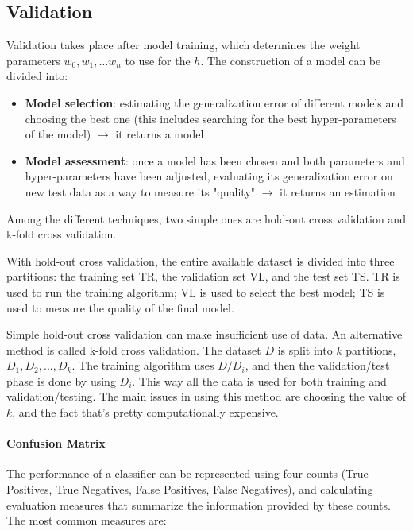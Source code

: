 \subsection{Validation}

Validation takes place after model training, which determines the weight parameters $w_0, w_1, \dots w_n$ to use for the $h$. The construction of a model can be divided into:

\begin{itemize}
    \item \textbf{Model selection}: estimating the generalization error of different models and choosing the best one (this includes searching for the best hyper-parameters of the model) $\xrightarrow{}$ it returns a model

    \item \textbf{Model assessment}: once a model has been chosen and both parameters and hyper-parameters have been adjusted, evaluating its generalization error on new test data as a way to measure its "quality" $\xrightarrow{}$ it returns an estimation
\end{itemize}

Among the different techniques, two simple ones are hold-out cross validation and k-fold cross validation.

With hold-out cross validation, the entire available dataset is divided into three partitions: the training set TR, the validation set VL, and the test set TS. TR is used to run the training algorithm; VL is used to select the best model; TS is used to measure the quality of the final model.

Simple hold-out cross validation can make insufficient use of data. An alternative method is called k-fold cross validation. The dataset $D$ is split into $k$ partitions, $D_1, D_2, ..., D_k$. The training algorithm uses $D/D_i$, and then the validation/test phase is done by using $D_i$. This way all the data is used for both training and validation/testing. The main issues in using this method are choosing the value of $k$, and the fact that's pretty computationally expensive.

\paragraph{Confusion Matrix}
The performance of a classifier can be represented using four counts (True Positives, True Negatives, False Positives, False Negatives), and calculating evaluation measures that summarize the information provided by these counts. The most common measures are:

